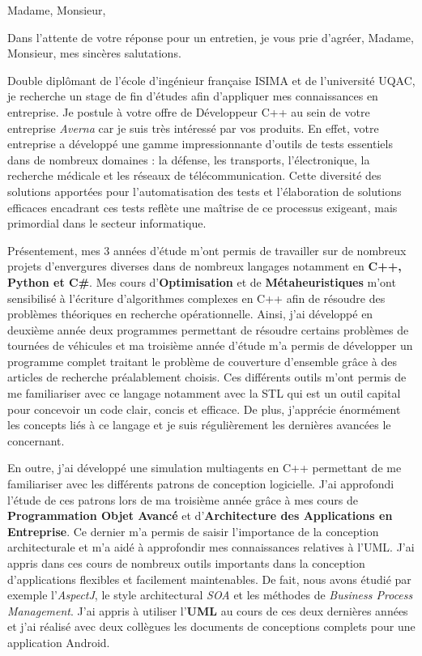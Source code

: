 \date{\today}
\opening{Madame, Monsieur,}
\closing{Dans l'attente de votre réponse pour un entretien, je vous prie d'agréer, Madame, Monsieur, mes sincères salutations.}

\makelettertitle

Double diplômant de l'école d'ingénieur française ISIMA et de l'université UQAC, je recherche un stage de fin d'études afin d'appliquer mes connaissances en entreprise.
Je postule à votre offre de Développeur C++ au sein de votre entreprise \textit{Averna} car je suis très intéressé par vos produits. En effet, votre entreprise a développé une gamme impressionnante d'outils de tests essentiels dans de nombreux domaines : la défense, les transports, l'électronique, la recherche médicale et les réseaux de télécommunication. Cette diversité des solutions apportées pour l'automatisation des tests et l'élaboration de solutions efficaces encadrant ces tests reflète une maîtrise de ce processus exigeant, mais primordial dans le secteur informatique.

Présentement, mes 3 années d'étude m'ont permis de travailler sur de nombreux projets d'envergures diverses dans de nombreux langages notamment en \textbf{C++, Python et C\#}. Mes cours d'\textbf{Optimisation} et de \textbf{Métaheuristiques} m'ont sensibilisé à l'écriture d'algorithmes complexes en C++ afin de résoudre des problèmes théoriques en recherche opérationnelle. Ainsi, j'ai développé en deuxième année deux programmes permettant de résoudre certains problèmes de tournées de véhicules et ma troisième année d'étude m'a permis de développer un programme complet traitant le problème de couverture d'ensemble grâce à des articles de recherche préalablement choisis. Ces différents outils m'ont permis de me familiariser avec ce langage notamment avec la STL qui est un outil capital pour concevoir un code clair, concis et efficace. De plus, j'apprécie énormément les concepts liés à ce langage et je suis régulièrement les dernières avancées le concernant.

En outre, j'ai développé une simulation multiagents en C++ permettant de me familiariser avec les différents patrons de conception logicielle. J'ai approfondi l'étude de ces patrons lors de ma troisième année grâce à mes cours de \textbf{Programmation Objet Avancé} et d'\textbf{Architecture des Applications en Entreprise}. Ce dernier m'a permis de saisir l'importance de la conception architecturale et m'a aidé à approfondir mes connaissances relatives à l'UML. J'ai appris dans ces cours de nombreux outils importants dans la conception d'applications flexibles et facilement maintenables. De fait, nous avons étudié par exemple l'\textit{AspectJ}, le style architectural \textit{SOA} et les méthodes de \textit{Business Process Management}. J'ai appris à utiliser l'\textbf{UML} au cours de ces deux dernières années et j'ai réalisé avec deux collègues les documents de conceptions complets pour une application Android.

